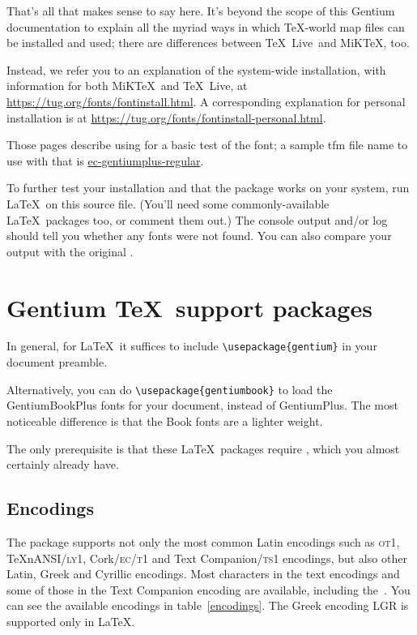 \documentclass[12pt, english]{article}
\def\TeXLive{\TeX~Live}
\def\MiKTeX{MiK\TeX}
\begin{document}
That's all that makes sense to say here.  It's beyond the
scope of this Gentium documentation to explain all the myriad ways in
which \TeX-world map files can be installed and used; there are
differences between \TeXLive\ and \MiKTeX, too.

Instead, we refer you to an explanation of the system-wide installation,
with information for both \MiKTeX\ and \TeXLive, at
\url{https://tug.org/fonts/fontinstall.html}.  A corresponding
explanation for personal installation is at
\url{https://tug.org/fonts/fontinstall-personal.html}. 

Those pages describe using  for a basic test of the
font; a sample tfm file name to use with that is
\url{ec-gentiumplus-regular}.

To further test your installation and that the package works on your
system, run \LaTeX\ on this  source file. (You'll need
some commonly-available \LaTeX\ packages too, or comment them out.) The
console output and/or log should tell you whether any fonts were not
found. You can also compare your output with the original
.


\section{Gentium \TeX\ support packages}\label{sec:support}

In general, for \LaTeX\ it suffices to include \verb|\usepackage{gentium}|
in your document preamble.

Alternatively, you can do \verb|\usepackage{gentiumbook}| to load the
GentiumBookPlus fonts for your document, instead of GentiumPlus. The
most noticeable difference is that the Book fonts are a lighter weight.

The only prerequisite is that these \LaTeX\ packages require
, which you almost certainly already have.


\subsection{Encodings}\label{sec:encs}

The package supports not only the most common Latin encodings such as
\textsc{ot1}, TeXnANSI/\textsc{ly1}, Cork/\textsc{ec}/\textsc{t1} and
Text Companion/\textsc{ts1} encodings, but also
other Latin, Greek and Cyrillic encodings. Most characters in the text
encodings and some of those in the Text Companion encoding are
available, including the~\texteuro.  You can see the available encodings
in table~\ref{encodings}. The Greek encoding LGR is supported only in
\LaTeX.
\end{document}

